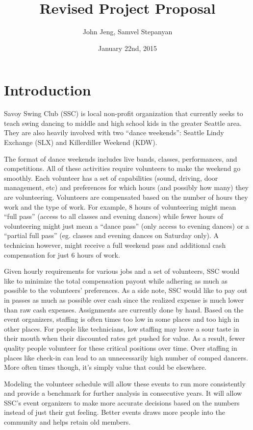 \documentclass[12pt]{article}
\title{Revised Project Proposal}
\author{John Jeng, Samvel Stepanyan}
\date{January 22nd, 2015}
\theoremstyle{definition}
\begin{document}
\maketitle
\section{Introduction}

Savoy Swing Club (SSC) is local non-profit organization that currently seeks to teach swing dancing to middle and high school kids in the greater Seattle area. They are also heavily involved with two ``dance weekends'': Seattle Lindy Exchange (SLX) and Killerdiller Weekend (KDW).

The format of dance weekends includes live bands, classes, performances, and competitions. All of these activities require volunteers to make the weekend go smoothly. Each volunteer has a set of capabilities (sound, driving, door management, etc) and preferences for which hours (and possibly how many) they are volunteering. Volunteers are compensated based on the number of hours they work and the type of work. For example, 8 hours of volunteering might mean ``full pass'' (access to all classes and evening dances) while fewer hours of volunteering might just mean a ``dance pass'' (only access to evening dances) or a ``partial full pass'' (eg. classes and evening dances on Saturday only). A technician however, might receive a full weekend pass and additional cash compensation for just 6 hours of work.

Given hourly requirements for various jobs and a set of volunteers, SSC would like to minimize the total compensation payout while adhering as much as possible to the volunteers’ preferences. As a side note, SSC would like to pay out in passes as much as possible over cash since the realized expense is much lower than raw cash expenses.
Assignments are currently done by hand. Based on the event organizers, staffing is often times too low in some places and too high in other places. For people like technicians, low staffing may leave a sour taste in their mouth when their discounted rates get pushed for value. As a result, fewer quality people volunteer for these critical positions over time. Over staffing in places like check-in can lead to an unnecessarily high number of comped dancers. More often times though, it’s simply value that could be elsewhere.

Modeling the volunteer schedule will allow these events to run more consistently and provide a benchmark for further analysis in consecutive years. It will allow SSC’s event organizers to make more accurate decisions based on the numbers instead of just their gut feeling. Better events draws more people into the community and helps retain old members.
\end{document}
